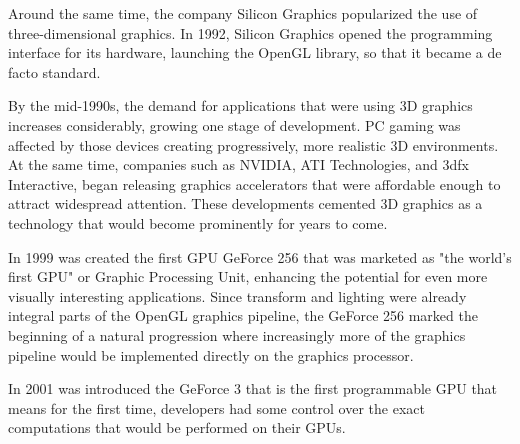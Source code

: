 \documentclass[Ingles]{ic-tese-v1}
\begin{document}
Around the same time, the company Silicon Graphics popularized the use
of three-dimensional graphics. In 1992, Silicon Graphics opened the
programming interface for its hardware, launching the OpenGL library, so that it became a de facto standard.

By the mid-1990s, the demand for applications that were using 3D graphics
increases considerably, growing one stage of development. PC gaming was affected
by those devices creating progressively, more realistic 3D environments.
At the same time, companies such as NVIDIA, ATI Technologies,
and 3dfx Interactive, began releasing graphics accelerators that were affordable
enough to attract widespread attention. These developments cemented 3D
graphics as a technology that would become prominently for years to come.

In 1999 was created the first GPU GeForce 256 that was marketed as "the world's
first GPU" or Graphic Processing Unit, enhancing the potential
for even more visually interesting applications. Since transform and lighting were
already integral parts of the OpenGL graphics pipeline, the GeForce 256 marked
the beginning of a natural progression where increasingly more of the graphics
pipeline would be implemented directly on the graphics processor.

In 2001 was introduced the GeForce 3 that is the first programmable GPU that means
for the first time, developers had some control over the exact computations
that would be performed on their GPUs.
\end{document}
